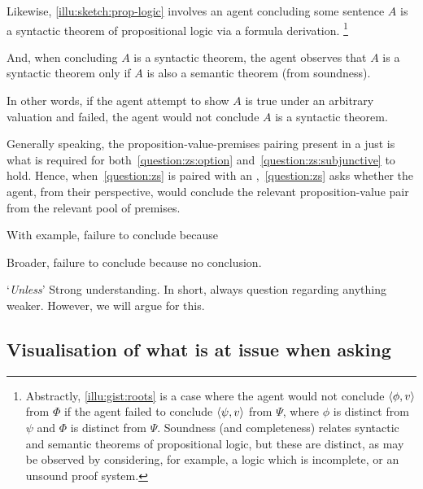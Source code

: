 \begin{note}
  Likewise, \autoref{illu:sketch:prop-logic} involves an agent concluding some sentence \(A\) is a syntactic theorem of propositional logic via a formula derivation.%
  \footnote{
    Abstractly, \autoref{illu:gist:roots} is a case where the agent would not conclude \(\langle \phi, v \rangle\) from \(\Phi\) if the agent failed to conclude \(\langle \psi, v \rangle\) from \(\Psi\), where \(\phi\) is distinct from \(\psi\) and \(\Phi\) is distinct from \(\Psi\).
    Soundness (and completeness) relates syntactic and semantic theorems of propositional logic, but these are distinct, as may be observed by considering, for example, a logic which is incomplete, or an unsound proof system.
  }

  And, when concluding \(A\) is a syntactic theorem, the agent observes that \(A\) is a syntactic theorem only if \(A\) is also a semantic theorem (from soundness).

  In other words, if the agent attempt to show \(A\) is true under an arbitrary valuation and failed, the agent would not conclude \(A\) is a syntactic theorem.
\end{note}

\begin{note}[In general]
  Generally speaking, the proposition-value-premises pairing present in a  just is what is required for both~\ref{question:zs:option} and~\ref{question:zs:subjunctive} to hold.
  Hence, when~\autoref{question:zs} is paired with an ,~\autoref{question:zs} asks whether the agent, from their perspective, would conclude the relevant proposition-value pair from the relevant pool of premises.
\end{note}


\begin{note}
  With example, failure to conclude because 


  Broader, failure to conclude because no conclusion.

  `\emph{Unless}'
  {
    \color{red}
    Strong understanding.
    In short, always question regarding anything weaker.
    However, we will argue for this.
  }
\end{note}

\subsection[Visualisation]{Visualisation of what is at issue when asking \qzS{}}

